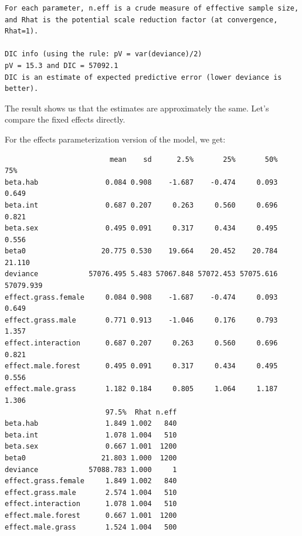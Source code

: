 \documentclass[
  13,
  letterpaper,
]{report}
\newenvironment{Shaded}{\begin{snugshade}}{\end{snugshade}}
\newcommand{\DecValTok}[1]{\textcolor[rgb]{0.68,0.00,0.00}{#1}}
\newcommand{\FloatTok}[1]{\textcolor[rgb]{0.68,0.00,0.00}{#1}}
\newcommand{\FunctionTok}[1]{\textcolor[rgb]{0.28,0.35,0.67}{#1}}
\newcommand{\NormalTok}[1]{\textcolor[rgb]{0.00,0.23,0.31}{#1}}
\newcommand{\SpecialCharTok}[1]{\textcolor[rgb]{0.37,0.37,0.37}{#1}}
\begin{document}
\begin{verbatim}
For each parameter, n.eff is a crude measure of effective sample size,
and Rhat is the potential scale reduction factor (at convergence, Rhat=1).

DIC info (using the rule: pV = var(deviance)/2)
pV = 15.3 and DIC = 57092.1
DIC is an estimate of expected predictive error (lower deviance is better).
\end{verbatim}

The result shows us that the estimates are approximately the same. Let's
compare the fixed effects directly.

For the effects parameterization version of the model, we get:

\begin{Shaded}
\end{Shaded}

\begin{verbatim}
                         mean    sd      2.5%       25%       50%       75%
beta.hab                0.084 0.908    -1.687    -0.474     0.093     0.649
beta.int                0.687 0.207     0.263     0.560     0.696     0.821
beta.sex                0.495 0.091     0.317     0.434     0.495     0.556
beta0                  20.775 0.530    19.664    20.452    20.784    21.110
deviance            57076.495 5.483 57067.848 57072.453 57075.616 57079.939
effect.grass.female     0.084 0.908    -1.687    -0.474     0.093     0.649
effect.grass.male       0.771 0.913    -1.046     0.176     0.793     1.357
effect.interaction      0.687 0.207     0.263     0.560     0.696     0.821
effect.male.forest      0.495 0.091     0.317     0.434     0.495     0.556
effect.male.grass       1.182 0.184     0.805     1.064     1.187     1.306
                        97.5%  Rhat n.eff
beta.hab                1.849 1.002   840
beta.int                1.078 1.004   510
beta.sex                0.667 1.001  1200
beta0                  21.803 1.000  1200
deviance            57088.783 1.000     1
effect.grass.female     1.849 1.002   840
effect.grass.male       2.574 1.004   510
effect.interaction      1.078 1.004   510
effect.male.forest      0.667 1.001  1200
effect.male.grass       1.524 1.004   500
\end{verbatim}
\end{document}
